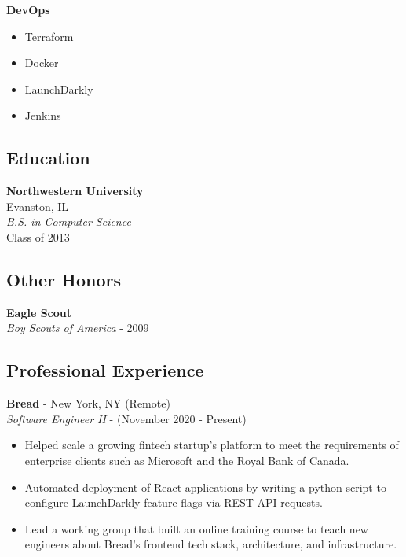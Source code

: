 \documentclass[10pt]{article}
\begin{document}
\begin{paracol}{2}
\noindent \textbf{DevOps}
\begin{itemize}
    \item Terraform
    \item Docker
    \item LaunchDarkly
    \item Jenkins
\end{itemize}

\subsection*{Education}
\textbf{Northwestern University} \\ 
Evanston, IL \\
\textit{B.S. in Computer Science}  \\
{\footnotesize{Class of 2013}}

\subsection*{Other Honors}
\textbf{Eagle Scout} \\
\textit{Boy Scouts of America} - {\footnotesize{2009}}

\switchcolumn 

\subsection*{Professional Experience} 

\textbf{Bread} - New York, NY (Remote) \\
\textit{Software Engineer II} - {\footnotesize{(November 2020 - Present)}} 
\begin{itemize}
    \item Helped scale a growing fintech startup's platform to meet the requirements of enterprise clients such as Microsoft and the Royal Bank of Canada.
    \item Automated deployment of React applications by writing a python script to configure LaunchDarkly feature flags via REST API requests.
    \item Lead a working group that built an online training course to teach new engineers about Bread's frontend tech stack, architecture, and infrastructure.
\end{itemize} 


\end{paracol}
\end{document}
